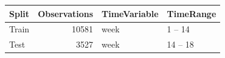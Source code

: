 \begin{tabular}{lrll}
\toprule
Split & Observations & TimeVariable & TimeRange \\
\midrule
Train & 10581 & week & 1 -- 14 \\
Test & 3527 & week & 14 -- 18 \\
\bottomrule
\end{tabular}
